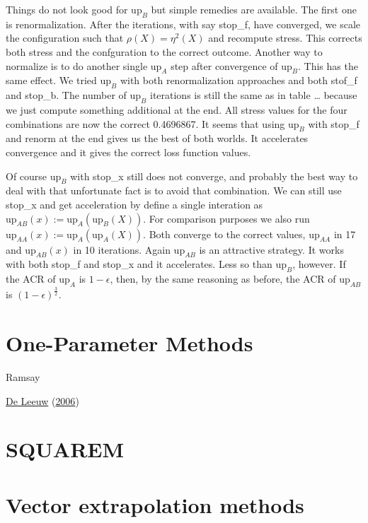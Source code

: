 \documentclass[
  12pt,
]{book}
\theoremstyle{definition}
\theoremstyle{definition}
\theoremstyle{definition}
\theoremstyle{definition}
\theoremstyle{remark}
\begin{document}
Things do not look good for \(\text{up}_B\) but simple remedies are available. The first one is renormalization. After
the iterations, with say stop\_f, have converged, we scale the configuration such that \(\rho(X)=\eta^2(X)\) and recompute stress. This corrects both stress and the confguration to the correct outcome. Another way to normalize is to
do another single \(\text{up}_A\) step after convergence of \(\text{up}_B\). This has the same effect. We tried \(\text{up}_B\)
with both renormalization approaches and both stof\_f and stop\_b. The number of \(\text{up}_B\) iterations
is still the same as in table \ldots{} because we just compute something additional at the end. All stress values for the four combinations are now the correct 0.4696867. It seems that using \(\text{up}_B\) with stop\_f and renorm at the end gives us the best of both worlds. It accelerates convergence and it gives the correct loss function values.

Of course \(\text{up}_B\) with stop\_x still does not converge, and probably the best way to deal with that unfortunate fact is to avoid that combination. We can still use stop\_x and get acceleration by define a single interation as \(\text{up}_{AB}(x):=\text{up}_A(\text{up}_B(X))\). For comparison purposes we also run \(\text{up}_{AA}(x):=\text{up}_A(\text{up}_A(X))\). Both converge to the correct values, \(\text{up}_{AA}\) in 17 and \(\text{up}_{AB}(x)\) in 10 iterations. Again \(\text{up}_{AB}\) is an attractive strategy. It works with both
stop\_f and stop\_x and it accelerates. Less so than \(\text{up}_B\), however. If the ACR of \(\text{up}_A\) is \(1-\epsilon\), then, by the same reasoning as before, the ACR of \(\text{up}_{AB}\) is \((1-\epsilon)^\frac32\).

\hypertarget{one-parameter-methods}{%
\section{One-Parameter Methods}\label{one-parameter-methods}}

Ramsay

\protect\hyperlink{ref-deleeuw_R_06b}{De Leeuw} (\protect\hyperlink{ref-deleeuw_R_06b}{2006})

\hypertarget{squarem}{%
\section{SQUAREM}\label{squarem}}

\hypertarget{vector-extrapolation-methods}{%
\section{Vector extrapolation methods}\label{vector-extrapolation-methods}}
\end{document}

